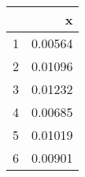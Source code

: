\begin{table}[ht]
\begin{center}
\begin{tabular}{rr}
  \hline
 & x \\ 
  \hline
1 & 0.00564 \\ 
  2 & 0.01096 \\ 
  3 & 0.01232 \\ 
  4 & 0.00685 \\ 
  5 & 0.01019 \\ 
  6 & 0.00901 \\ 
   \hline
\end{tabular}
\end{center}
\end{table}
